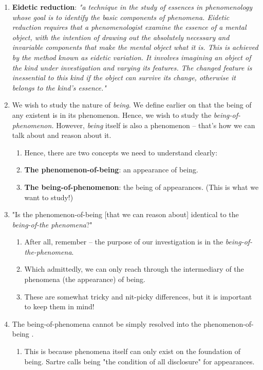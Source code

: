 \begin{enumerate}
  \item \textbf{Eidetic reduction}: \emph{"a technique in the study of essences in phenomenology whose goal is to identify the basic components of phenomena. Eidetic reduction requires that a phenomenologist examine the essence of a mental object, with the intention of drawing out the absolutely necessary and invariable components that make the mental object what it is. This is achieved by the method known as eidetic variation. It involves imagining an object of the kind under investigation and varying its features. The changed feature is inessential to this kind if the object can survive its change, otherwise it belongs to the kind's essence."} \autocite{enwiki:995672467}
  \item We wish to study the nature of \emph{being}. We define earlier on that the being of any existent is in its phenomenon. Hence, we wish to study the \emph{being-of-phenomenon.} However, \emph{being} itself is also a phenomenon -- that's how we can talk about and reason about it.
  \begin{enumerate}
    \item Hence, there are two concepts we need to understand clearly:
    \item \textbf{The phenomenon-of-being}: an appearance of being.
    \item \textbf{The being-of-phenomenon}: the being of appearances. (This is what we want to study!)
  \end{enumerate}
  \item "Is the phenomenon-of-being [that we can reason about] identical to the \emph{being-of-the phenomena}?" \autocite[6]{sartre}
  \begin{enumerate}
    \item After all, remember -- the purpose of our investigation is in the \emph{being-of-the-phenomena}.
    \item Which admittedly, we can only reach through the intermediary of the phenomena (the appearance) of being.
    \item These are somewhat tricky and nit-picky differences, but it is important to keep them in mind!
  \end{enumerate}
  \item The being-of-phenomena cannot be simply resolved into the phenomenon-of-being \autocite[7]{sartre}.
  \begin{enumerate}
    \item This is because phenomena itself can only exist on the foundation of being. Sartre calls being "the condition of all disclosure" for appearances.

\end{enumerate}
\end{enumerate}
